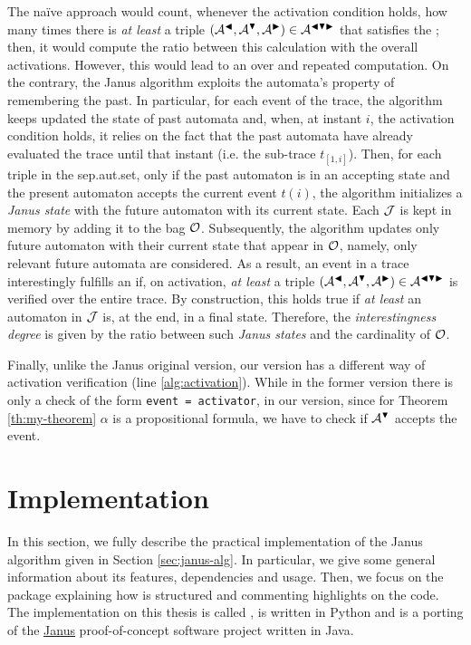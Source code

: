 The na\"ive approach would count, whenever the activation condition holds, how many times there is  \textit{at least} a triple $(\mathcal{A}^{\blacktriangleleft}, \mathcal{A}^{\blacktriangledown}, \mathcal{A}^{\blacktriangleright}) \in \mathcal{A}^{\blacktriangleleft \blacktriangledown \blacktriangleright}$ that satisfies the \rcon\xspace; then, it would compute the ratio between this calculation with the overall activations. However, this would lead to an over and repeated computation. On the contrary, the Janus algorithm exploits the automata's property of remembering the past. In particular, for each event of the trace, the algorithm keeps updated the state of past automata and, when, at instant $i$, the activation condition holds, it relies on the fact that the past automata have already evaluated the trace until that instant (i.e. the sub-trace $t_{[1,i]}$). Then, for each triple in the sep.aut.set, only if the past automaton is in an accepting state and the present automaton accepts the current event $t(i)$, the algorithm initializes a \textit{Janus state} with the future automaton with its current state. Each $\mathcal{J}$ is kept in memory by adding it to the bag $\mathcal{O}$. Subsequently, the algorithm updates only future automaton with their current state that appear in $\mathcal{O}$, namely, only relevant future automata are considered. As a result, an event in a trace interestingly fulfills an \rcon\xspace if, on activation, \textit{at least} a triple $(\mathcal{A}^{\blacktriangleleft}, \mathcal{A}^{\blacktriangledown}, \mathcal{A}^{\blacktriangleright}) \in \mathcal{A}^{\blacktriangleleft \blacktriangledown \blacktriangleright}$ is verified over the entire trace. By construction, this holds true if \textit{at least} an automaton in $\mathcal{J}$ is, at the end, in a final state. Therefore, the \textit{interestingness degree} is given by the ratio between such \textit{Janus states} and the cardinality of $\mathcal{O}$.

Finally, unlike the Janus original version, our version has a different way of activation verification (line \ref{alg:activation}). While in the former version there is only a check of the form \texttt{event = activator}, in our version, since for Theorem \ref{th:my-theorem} $\alpha$ is a propositional formula, we have to check if $\mathcal{A}^{\blacktriangledown}$ accepts the event.

\section{Implementation}\label{sec:janus-implementation}
In this section, we fully describe the practical implementation of the Janus algorithm given in Section \ref{sec:janus-alg}. In particular, we give some general information about its features, dependencies and usage. Then, we focus on the package explaining how is structured and commenting highlights on the code. The implementation on this thesis is called \janus, is written in Python and is a porting of the \href{https://github.com/Oneiroe/Janus}{Janus} proof-of-concept software project written in Java.

